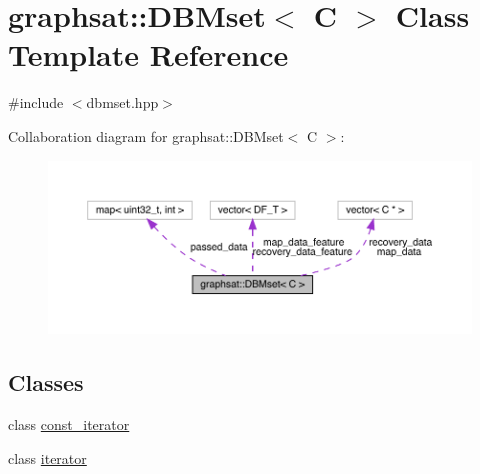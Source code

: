 \hypertarget{classgraphsat_1_1_d_b_mset}{}\section{graphsat\+::D\+B\+Mset$<$ C $>$ Class Template Reference}
\label{classgraphsat_1_1_d_b_mset}


{\ttfamily \#include $<$dbmset.\+hpp$>$}



Collaboration diagram for graphsat\+::D\+B\+Mset$<$ C $>$\+:
\nopagebreak
\begin{figure}[H]
\begin{center}
\leavevmode
\includegraphics[width=350pt]{classgraphsat_1_1_d_b_mset__coll__graph}
\end{center}
\end{figure}
\subsection*{Classes}
\begin{DoxyCompactItemize}
\item 
class \mbox{\hyperlink{classgraphsat_1_1_d_b_mset_1_1const__iterator}{const\+\_\+iterator}}
\item 
class \mbox{\hyperlink{classgraphsat_1_1_d_b_mset_1_1iterator}{iterator}}
\end{DoxyCompactItemize}
